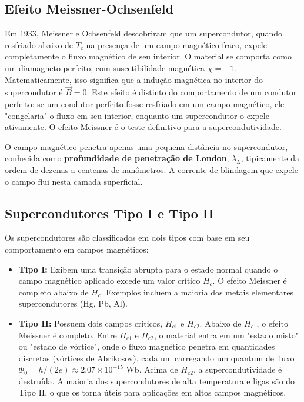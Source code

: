 \documentclass[12pt, a4paper, oneside]{report}
\begin{document}
\subsection{Efeito Meissner-Ochsenfeld}

Em 1933, Meissner e Ochsenfeld descobriram que um supercondutor, quando resfriado abaixo de $T_c$ na presença de um campo magnético fraco, expele completamente o fluxo magnético de seu interior. O material se comporta como um diamagneto perfeito, com suscetibilidade magnética $\chi = -1$. Matematicamente, isso significa que a indução magnética no interior do supercondutor é $\vec{B} = 0$. Este efeito é distinto do comportamento de um condutor perfeito: se um condutor perfeito fosse resfriado em um campo magnético, ele "congelaria" o fluxo em seu interior, enquanto um supercondutor o expele ativamente. O efeito Meissner é o teste definitivo para a supercondutividade.

O campo magnético penetra apenas uma pequena distância no supercondutor, conhecida como \textbf{profundidade de penetração de London}, $\lambda_L$, tipicamente da ordem de dezenas a centenas de nanômetros. A corrente de blindagem que expele o campo flui nesta camada superficial.

\subsection{Supercondutores Tipo I e Tipo II}

Os supercondutores são classificados em dois tipos com base em seu comportamento em campos magnéticos:

\begin{itemize}
    \item \textbf{Tipo I:} Exibem uma transição abrupta para o estado normal quando o campo magnético aplicado excede um valor crítico $H_c$. O efeito Meissner é completo abaixo de $H_c$. Exemplos incluem a maioria dos metais elementares supercondutores (Hg, Pb, Al).
    \item \textbf{Tipo II:} Possuem dois campos críticos, $H_{c1}$ e $H_{c2}$. Abaixo de $H_{c1}$, o efeito Meissner é completo. Entre $H_{c1}$ e $H_{c2}$, o material entra em um "estado misto" ou "estado de vórtice", onde o fluxo magnético penetra em quantidades discretas (vórtices de Abrikosov), cada um carregando um quantum de fluxo $\Phi_0 = h/(2e) \approx 2.07 \times 10^{-15}$ Wb. Acima de $H_{c2}$, a supercondutividade é destruída. A maioria dos supercondutores de alta temperatura e ligas são do Tipo II, o que os torna úteis para aplicações em altos campos magnéticos.
\end{itemize}
\end{document}

